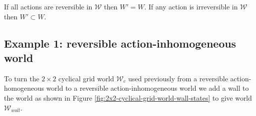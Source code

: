 \begin{remark}
    If all actions are reversible in $\mathscr{W}$ then $W' = W$.
    If any action is irreversible in $\mathscr{W}$ then $W' \subset W$.
\end{remark}

\subsection{Example 1: reversible action-inhomogeneous world}\label{sec:identity reversible action-inhomogeneous world}

To turn the $2 \times 2$ cyclical grid world $\mathscr{W}_{c}$ used previously from a reversible action-homogeneous world to a reversible action-inhomogeneous world we add a wall to the world as shown in Figure \ref{fig:2x2-cyclical-grid-world-wall-states} to give world $\mathscr{W}_{wall}$.

